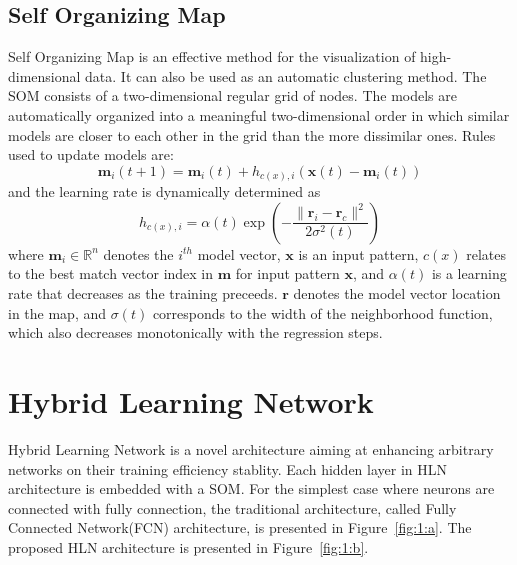 \documentclass[3p,times,procedia]{elsarticle}
\begin{document}
\subsection{Self Organizing Map}
Self Organizing Map is an effective 
method for the visualization of 
high-dimensional data. 
It can also be used 
as an automatic clustering method. 
The SOM consists of a two-dimensional 
regular grid of nodes. 
The models are automatically 
organized into a meaningful 
two-dimensional order in which 
similar models are closer to
each other in the grid than 
the more dissimilar
ones\cite{kohonen1998self}.
Rules used to update models are:
\begin{equation}
	\mathbf{m}_i(t+1)=\mathbf{m}_i(t)+
	h_{c(x),i}\left(
	\mathbf{x}(t)-\mathbf{m}_i(t)
	\right)
	\label{eq:8}
\end{equation}
and the learning rate is 
dynamically determined as
\begin{equation}
	h_{c(x),i} = \alpha(t)\exp\left(
	-\frac{\|\mathbf{r}_i-\mathbf{r}_c\|^2}
	{2\sigma^2(t)}
	\right)
	\label{eq:9}
\end{equation}
where $\mathbf{m}_i\in\mathbb{R}^n$ 
denotes the $i^{th}$ model vector, 
$\mathbf{x}$ is an input pattern,
$c(x)$ relates to the best match 
vector index
in $\mathbf{m}$ for input 
pattern $\mathbf{x}$,
and $\alpha(t)$ is a learning rate 
that decreases as the
training preceeds.
$\mathbf{r}$ denotes the model vector 
location in 
the map, and $\sigma(t)$ 
corresponds to the 
width of the neighborhood 
function, which 
also decreases monotonically 
with the regression steps.

\section{Hybrid Learning Network}
Hybrid Learning Network is a novel
architecture aiming at 
enhancing arbitrary networks
on their training efficiency
stablity.
Each hidden layer in HLN architecture 
is embedded with a SOM. For the 
simplest case where neurons are connected 
with fully connection, the traditional
architecture, called Fully 
Connected Network(FCN) architecture,
is presented in Figure~\ref{fig:1:a}.
The proposed HLN architecture is
presented in Figure~\ref{fig:1:b}.
\end{document}
